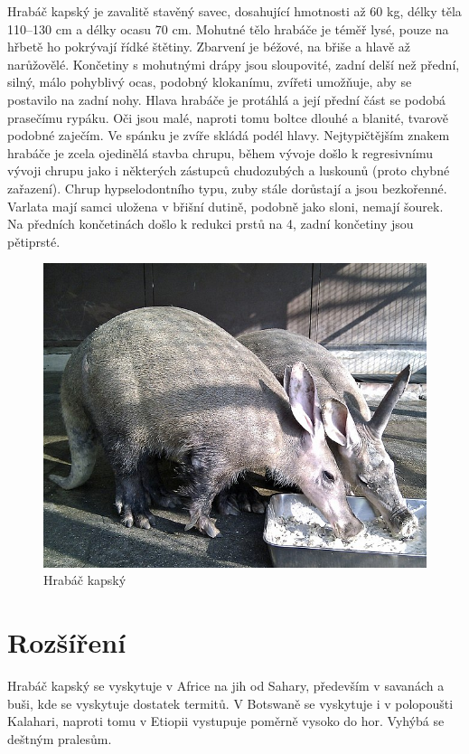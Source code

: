 \documentclass[a4paper, 12pt]{article}
\begin{document}
Hrabáč kapský je zavalitě stavěný savec, dosahující hmotnosti až 60 kg, délky těla 110--130 cm a délky ocasu 70 cm.
Mohutné tělo hrabáče je téměř lysé, pouze na hřbetě ho pokrývají řídké štětiny.
Zbarvení je béžové, na břiše a hlavě až narůžovělé.
Končetiny s mohutnými drápy jsou sloupovité, zadní delší než přední, silný, málo pohyblivý ocas, podobný klokanímu, zvířeti umožňuje, aby se postavilo na zadní nohy.
Hlava hrabáče je protáhlá a její přední část se podobá prasečímu rypáku. Oči jsou malé, naproti tomu boltce dlouhé a blanité, tvarově podobné zaječím. Ve spánku je zvíře skládá podél hlavy.
Nejtypičtějším znakem hrabáče je zcela ojedinělá stavba chrupu, během vývoje došlo k regresivnímu vývoji chrupu jako i některých zástupců chudozubých a luskounů (proto chybné zařazení).
Chrup hypselodontního typu, zuby stále dorůstají a jsou bezkořenné.
Varlata mají samci uložena v břišní dutině, podobně jako sloni, nemají šourek.
Na předních končetinách došlo k redukci prstů na 4, zadní končetiny jsou pětiprsté.

\begin{figure}
    \centering
    \includegraphics[width = \textwidth]{obrazky/hrabac_kapsky.jpg}
    \caption{Hrabáč kapský}
\end{figure}


\section{Rozšíření}

Hrabáč kapský se vyskytuje v Africe na jih od Sahary, především v savanách a buši, kde se vyskytuje dostatek termitů.
V Botswaně se vyskytuje i v polopoušti Kalahari, naproti tomu v Etiopii vystupuje poměrně vysoko do hor.
Vyhýbá se deštným pralesům.
\end{document}
